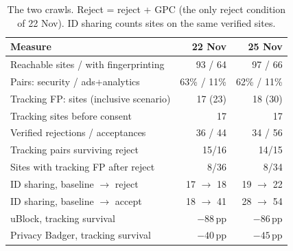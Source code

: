 \documentclass[sigconf,review,anonymous]{acmart}
\newcommand{\pp}{\,pp}
\begin{document}
\begin{table}[t]
\caption{The two crawls. Reject = reject + GPC (the only reject condition of 22 Nov). ID sharing
counts sites on the same verified sites.}\label{tab:replication}
\small
\begin{tabular}{@{}lrr@{}}
\toprule
Measure & 22 Nov & 25 Nov \\
\midrule
Reachable sites / with fingerprinting & 93 / 64 & 97 / 66 \\
Pairs: security / ads+analytics & 63\% / 11\% & 62\% / 11\% \\
Tracking FP: sites (inclusive scenario) & 17 (23) & 18 (30) \\
Tracking sites before consent & 17 & 17 \\
Verified rejections / acceptances & 36 / 44 & 34 / 56 \\
Tracking pairs surviving reject & 15/16 & 14/15 \\
Sites with tracking FP after reject & 8/36 & 8/34 \\
ID sharing, baseline $\rightarrow$ reject & 17 $\rightarrow$ 18 & 19 $\rightarrow$ 22 \\
ID sharing, baseline $\rightarrow$ accept & 18 $\rightarrow$ 41 & 28 $\rightarrow$ 54 \\
uBlock, tracking survival & $-88$\pp{} & $-86$\pp{} \\
Privacy Badger, tracking survival & $-40$\pp{} & $-45$\pp{} \\
\bottomrule
\end{tabular}
\end{table}
\end{document}
